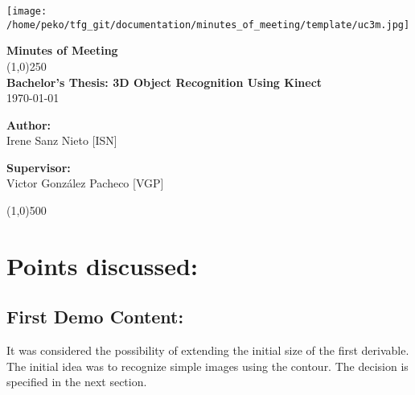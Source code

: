 \documentclass{article}
\newenvironment{myindentpar}[1]%
 {\begin{list}{}%
         {\setlength{\leftmargin}{#1}}%
         \item[]%
 }
 {\end{list}}
\begin{document}
\texttt{[image: /home/peko/tfg\_git/documentation/minutes\_of\_meeting/template/uc3m.jpg]}


\vspace{-1cm}
\begin{minipage}[b]{1\linewidth}
	\begin{center}
	{\Huge \bfseries{Minutes of Meeting}}\\
	\line(1,0){250}\\[1cm]
	{\LARGE \textbf{Bachelor's Thesis: 3D Object Recognition Using Kinect}}\\[0.5cm]
	{\large \today}
	\end{center}
\end {minipage}



\begin{minipage}{0.55\textwidth}
\begin{flushleft} \large
\textbf{{Author:}\\}
Irene Sanz Nieto [ISN]\\
\end{flushleft}
\end{minipage}
\begin{minipage}{0.4\textwidth}
\begin{flushright} \large
\textbf{Supervisor: }\\
Victor González Pacheco [VGP]
\end{flushright}\end{minipage}

\begin{center}
\line(1,0){500}
\end{center}







\section{\LARGE Points discussed: }

		\subsection{First Demo Content:}
		\begin{myindentpar}{1cm}
		It was considered the possibility of extending the initial size of the first derivable. The initial idea was to recognize simple images using the contour. The decision is specified in the next section.
		\end{myindentpar}
\end{document}
